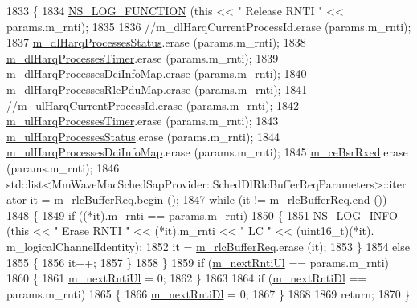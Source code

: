 \begin{DoxyCode}
1833 \{
1834   \hyperlink{log-macros-disabled_8h_a90b90d5bad1f39cb1b64923ea94c0761}{NS\_LOG\_FUNCTION} (\textcolor{keyword}{this} << \textcolor{stringliteral}{" Release RNTI "} << params.m\_rnti);
1835 
1836   \textcolor{comment}{//m\_dlHarqCurrentProcessId.erase (params.m\_rnti);}
1837   \hyperlink{classns3_1_1MmWaveFlexTtiMacScheduler_a7ea48669590368853d16240acf7dbebe}{m\_dlHarqProcessesStatus}.erase  (params.m\_rnti);
1838   \hyperlink{classns3_1_1MmWaveFlexTtiMacScheduler_a321e6f7863545e750acf6e94855514c5}{m\_dlHarqProcessesTimer}.erase (params.m\_rnti);
1839   \hyperlink{classns3_1_1MmWaveFlexTtiMacScheduler_a2820fea8cd85e2351bc0b046bdfb8414}{m\_dlHarqProcessesDciInfoMap}.erase  (params.m\_rnti);
1840   \hyperlink{classns3_1_1MmWaveFlexTtiMacScheduler_a7b37cf0428128dbfe578cd3c5d3ffbe9}{m\_dlHarqProcessesRlcPduMap}.erase  (params.m\_rnti);
1841   \textcolor{comment}{//m\_ulHarqCurrentProcessId.erase  (params.m\_rnti);}
1842   \hyperlink{classns3_1_1MmWaveFlexTtiMacScheduler_a27a2652523d0e61fa7da08a7d43b84a1}{m\_ulHarqProcessesTimer}.erase (params.m\_rnti);
1843   \hyperlink{classns3_1_1MmWaveFlexTtiMacScheduler_af728e6ddeaaf55536ca842682904d64a}{m\_ulHarqProcessesStatus}.erase  (params.m\_rnti);
1844   \hyperlink{classns3_1_1MmWaveFlexTtiMacScheduler_ad18cf8a17f05488fc679bd891175864f}{m\_ulHarqProcessesDciInfoMap}.erase  (params.m\_rnti);
1845   \hyperlink{classns3_1_1MmWaveFlexTtiMacScheduler_a3f24f21e6b97c5f90be970f6f8b3bffa}{m\_ceBsrRxed}.erase (params.m\_rnti);
1846   std::list<MmWaveMacSchedSapProvider::SchedDlRlcBufferReqParameters>::iterator it = 
      \hyperlink{classns3_1_1MmWaveFlexTtiMacScheduler_a2d166013dff600afe51e8c038c36db2b}{m\_rlcBufferReq}.begin ();
1847   \textcolor{keywordflow}{while} (it != \hyperlink{classns3_1_1MmWaveFlexTtiMacScheduler_a2d166013dff600afe51e8c038c36db2b}{m\_rlcBufferReq}.end ())
1848     \{
1849       \textcolor{keywordflow}{if} ((*it).m\_rnti == params.m\_rnti)
1850         \{
1851           \hyperlink{group__logging_gafbd73ee2cf9f26b319f49086d8e860fb}{NS\_LOG\_INFO} (\textcolor{keyword}{this} << \textcolor{stringliteral}{" Erase RNTI "} << (*it).m\_rnti << \textcolor{stringliteral}{" LC "} << (uint16\_t)(*it).
      m\_logicalChannelIdentity);
1852           it = \hyperlink{classns3_1_1MmWaveFlexTtiMacScheduler_a2d166013dff600afe51e8c038c36db2b}{m\_rlcBufferReq}.erase (it);
1853         \}
1854       \textcolor{keywordflow}{else}
1855         \{
1856           it++;
1857         \}
1858     \}
1859   \textcolor{keywordflow}{if} (\hyperlink{classns3_1_1MmWaveFlexTtiMacScheduler_a1f7e10e2f29bb79dfda9b0a606cf2521}{m\_nextRntiUl} == params.m\_rnti)
1860     \{
1861       \hyperlink{classns3_1_1MmWaveFlexTtiMacScheduler_a1f7e10e2f29bb79dfda9b0a606cf2521}{m\_nextRntiUl} = 0;
1862     \}
1863 
1864   \textcolor{keywordflow}{if} (\hyperlink{classns3_1_1MmWaveFlexTtiMacScheduler_a8ff812f1c85c8c9ec3d0eba88e7c090a}{m\_nextRntiDl} == params.m\_rnti)
1865     \{
1866       \hyperlink{classns3_1_1MmWaveFlexTtiMacScheduler_a8ff812f1c85c8c9ec3d0eba88e7c090a}{m\_nextRntiDl} = 0;
1867     \}
1868 
1869   \textcolor{keywordflow}{return};
1870 \}
\end{DoxyCode}


